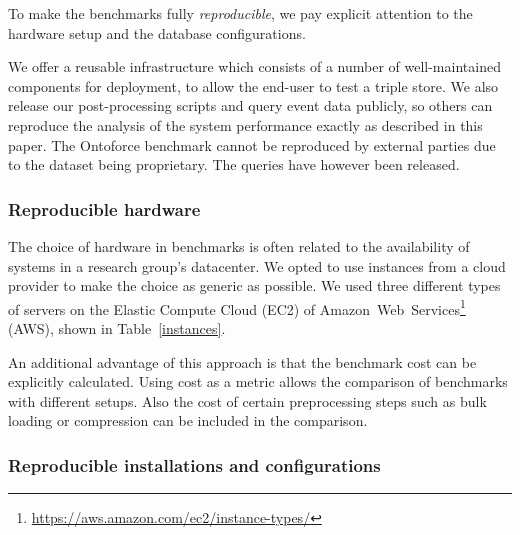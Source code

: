 To make the benchmarks fully \emph{reproducible}, we pay explicit attention to the hardware setup and the database configurations. 

We offer a reusable infrastructure which consists of a number of well-maintained components for deployment, 
to allow the end-user to test a triple store. 
We also release our post-processing scripts and query event data publicly, so others can reproduce the analysis of the system performance exactly as described in this paper. 
The Ontoforce benchmark cannot be reproduced by external parties due to the dataset being proprietary. The queries have however been released.

\subsubsection{Reproducible hardware}
The choice of hardware in benchmarks is often related to the availability of systems in a research group's datacenter.
We opted to use instances from a cloud provider to make the choice as generic as possible. 
We used three different types of servers on the Elastic Compute Cloud (EC2) of \mbox{Amazon Web Services\footnote{\scriptsize \url{https://aws.amazon.com/ec2/instance-types/}}} (AWS), shown in Table~\ref{instances}. 

\begin{table}[ht!]
	\centering
	\caption{Instance types used in benchmarks and their purpose.}
	\label{instances}
\end{table}

An additional advantage of this approach is that the benchmark cost can be explicitly calculated. Using cost as a metric allows the comparison of benchmarks with different setups. Also the cost of certain preprocessing steps such as bulk loading or compression can be included in the comparison.

\subsubsection{Reproducible installations and configurations}

